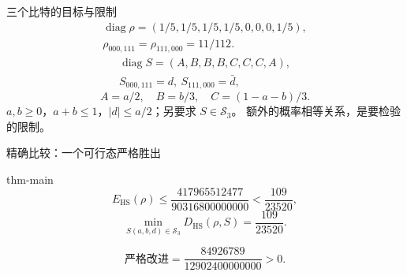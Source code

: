 \documentclass{beamer}
\begin{document}
\begin{frame}{三个比特的目标与限制}
\[
\begin{gathered}
\operatorname{diag}\rho=(1/5,1/5,1/5,1/5,0,0,0,1/5),\\
\rho_{000,111}=\rho_{111,000}=11/112.
\end{gathered}
\]
\[
\begin{gathered}
\operatorname{diag}S=(A,B,B,B,C,C,C,A),\\
S_{000,111}=d,\ S_{111,000}=\bar d,
\end{gathered}
\]
\[
A=a/2,\quad B=b/3,\quad C=(1-a-b)/3.
\]
$a,b\ge0$，$a+b\le1$，$|d|\le a/2$；另要求 $S\in\mathcal S_3$。
\medskip
\alert{额外的概率相等关系，是要检验的限制。}
\end{frame}
\begin{frame}{精确比较：一个可行态严格胜出}
\begin{bookresult}{thm-main}
\[
E_{\mathrm{HS}}(\rho)\le\frac{417965512477}{90316800000000}
<\frac{109}{23520},
\]
\[
\min_{S(a,b,d)\in\mathcal S_3}D_{\mathrm{HS}}(\rho,S)=\frac{109}{23520}.
\]
\end{bookresult}
\[
\text{严格改进}=\frac{84926789}{12902400000000}>0.
\]
\end{frame}
\end{document}
